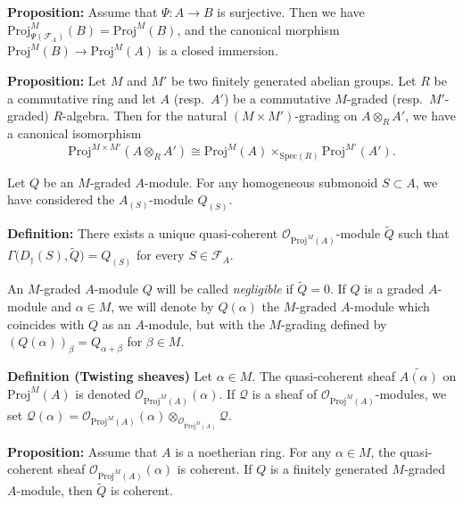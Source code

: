 \documentclass[graybox]{svmult}
\begin{document}
\vspace{0.25\baselineskip}
\noindent
\textbf{{Proposition:}}
Assume that $\Psi : A \to B$ is surjective. Then we have $\mathrm{Proj}^M_{\Psi (\mathcal{F}_A)} (B) = \mathrm{Proj}^M (B)$, and the canonical morphism
 $\mathrm{Proj}^M(B) \to \mathrm{Proj}^M(A)$
is a closed immersion.



\vspace{0.25\baselineskip}
\noindent
\textbf{{Proposition:}}
 Let $M$ and $M'$ be two finitely generated abelian groups. Let $R$ be a commutative ring and let $A$ (resp.~$A'$) be a commutative $M$-graded (resp.~$M'$-graded) $R$-algebra. 
 Then for the natural $(M \times M')$-grading on $A \otimes_R A'$, we have a canonical isomorphism
 \[
 \mathrm{Proj} ^{M \times M'} (A \otimes_R A') \cong \mathrm{Proj} ^M (A) \times_{\mathrm{Spec}(R)} \mathrm{Proj} ^{M'} (A'). 
 \]


Let $Q$ be an $M$-graded $A$-module. For any homogeneous submonoid $S \subset A$, we have considered the $A_{(S)}$-module $Q_{(S)}$. 

\vspace{0.25\baselineskip}
\noindent
\textbf{{Definition:}}
There exists 
a unique quasi-coherent $\mathcal{O}_{\mathrm{Proj}^M(A)}$-module $\widetilde{Q}$ such that
$\Gamma \bigl( D_\dag(S)  , \widetilde{Q} \bigr) = Q_{(S)}$
for every $S \in \mathcal{F}_A$.



An $M$-graded $A$-module $Q$ will be called \emph{negligible} if $\widetilde{Q}=0$. 
If $Q$ is a graded $A$-module and $\alpha \in M$, we will denote by $Q(\alpha)$ the $M$-graded $A$-module which coincides with $Q$ as an $A$-module, but with the $M$-grading defined by $(Q(\alpha))_\beta = Q_{\alpha+\beta}$ for $\beta \in M$.


\vspace{0.25\baselineskip}
\noindent
{\textbf{Definition (Twisting sheaves)}}
Let $\alpha \in M$.
The quasi-coherent sheaf $\widetilde{A(\alpha)}$ on $\mathrm{Proj}^M(A)$ is 
denoted $\mathcal{O}_{\mathrm{Proj}^M(A)} (\alpha)$.
If $\mathcal{Q}$ is a sheaf of $\mathcal{O}_{\mathrm{Proj}^M(A)}$-modules, we set $\mathcal{Q} (\alpha) = \mathcal{O}_{\mathrm{Proj}^M(A)} (\alpha ) \otimes_{\mathcal{O}_{\mathrm{Proj}^M(A)}} \mathcal{Q}$.





\vspace{0.25\baselineskip}
\noindent
\textbf{{Proposition:}}
Assume that $A$ is a noetherian ring.
For any $\alpha \in M$, the quasi-coherent sheaf $\mathcal{O}_{\mathrm{Proj}^M(A)} (\alpha)$ is coherent.
If $Q$ is a finitely generated $M$-graded $A$-module, then $\widetilde{Q}$ is coherent.
\end{document}
